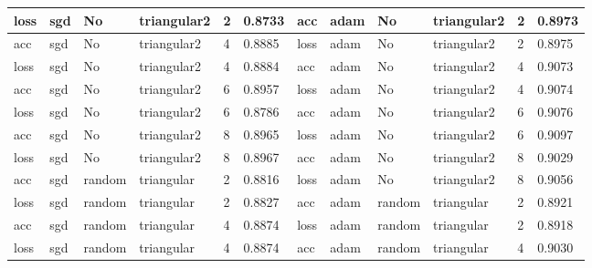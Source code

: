 \begin{table}[H]
\begin{adjustbox}{width=1\textwidth}
\begin{tabular}{|l|l|l|l|l|l||l|l|l|l|l|l|}
loss          & sgd          & No          & triangular2      & 2             & 0.8733            & acc           & adam         & No          & triangular2      & 2             & 0.8973            \\ \hline
acc           & sgd          & No          & triangular2      & 4             & 0.8885            & loss          & adam         & No          & triangular2      & 2             & 0.8975            \\ \hline
loss          & sgd          & No          & triangular2      & 4             & 0.8884            & acc           & adam         & No          & triangular2      & 4             & 0.9073            \\ \hline
acc           & sgd          & No          & triangular2      & 6             & 0.8957            & loss          & adam         & No          & triangular2      & 4             & 0.9074            \\ \hline
loss          & sgd          & No          & triangular2      & 6             & 0.8786            & acc           & adam         & No          & triangular2      & 6             & 0.9076            \\ \hline
acc           & sgd          & No          & triangular2      & 8             & 0.8965            & loss          & adam         & No          & triangular2      & 6             & 0.9097            \\ \hline
loss          & sgd          & No          & triangular2      & 8             & 0.8967            & acc           & adam         & No          & triangular2      & 8             & 0.9029            \\ \hline
acc           & sgd          & random        & triangular       & 2             & 0.8816            & loss          & adam         & No          & triangular2      & 8             & 0.9056            \\ \hline
loss          & sgd          & random        & triangular       & 2             & 0.8827            & acc           & adam         & random        & triangular       & 2             & 0.8921            \\ \hline
acc           & sgd          & random        & triangular       & 4             & 0.8874            & loss          & adam         & random        & triangular       & 2             & 0.8918            \\ \hline
loss          & sgd          & random        & triangular       & 4             & 0.8874            & acc           & adam         & random        & triangular       & 4             & 0.9030            \\ \hline

\end{tabular}
\end{adjustbox}
\end{table}

